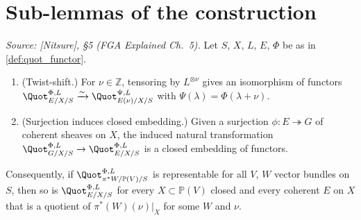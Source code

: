 \section{Sub-lemmas of the construction}
\label{sec:quot_sub_lemmas}

\begin{lemma}
  \label{lem:quot_reduction_to_pi_star_W}

  \textit{Source: [Nitsure], \S 5 (FGA Explained Ch.~5).}
  Let \(S\), \(X\), \(L\), \(E\), \(\Phi\) be as in \cref{def:quot_functor}.
  \begin{enumerate}
    \item (Twist-shift.) For \(\nu \in \mathbb{Z}\), tensoring by
      \(L^{\otimes \nu}\) gives an isomorphism of functors
      \(\Quot^{\Phi,L}_{E/X/S} \xrightarrow{\sim}
      \Quot^{\Psi,L}_{E(\nu)/X/S}\) with \(\Psi(\lambda) = \Phi(\lambda + \nu)\).
    \item (Surjection induces closed embedding.) Given a surjection
      \(\phi : E \twoheadrightarrow G\) of coherent sheaves on \(X\), the
      induced natural transformation
      \(\Quot^{\Phi,L}_{G/X/S} \to \Quot^{\Phi,L}_{E/X/S}\) is a closed
      embedding of functors.
  \end{enumerate}
  Consequently, if \(\Quot^{\Phi,L}_{\pi^* W / \mathbb{P}(V)/S}\) is
  representable for all \(V\), \(W\) vector bundles on \(S\), then so is
  \(\Quot^{\Phi,L}_{E/X/S}\) for every \(X \subset \mathbb{P}(V)\) closed and
  every coherent \(E\) on \(X\) that is a quotient of \(\pi^*(W)(\nu)|_X\) for
  some \(W\) and \(\nu\).
\end{lemma}

